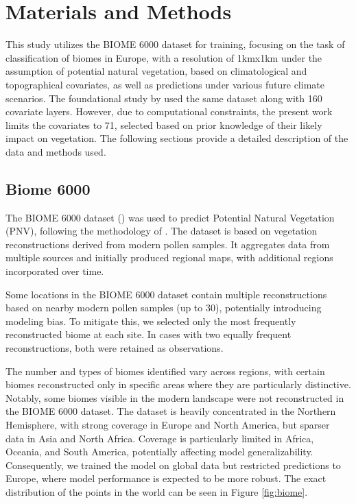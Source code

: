 \documentclass[
]{krantz}
\begin{document}
\section{Materials and Methods}\label{materials-and-methods}

This study utilizes the BIOME 6000 dataset for training, focusing on the task of classification of biomes in Europe, with a resolution of 1kmx1km under the assumption of potential natural vegetation, based on climatological and topographical covariates, as well as predictions under various future climate scenarios. The foundational study by \citet{hengl2018} used the same dataset along with 160 covariate layers. However, due to computational constraints, the present work limits the covariates to 71, selected based on prior knowledge of their likely impact on vegetation. The following sections provide a detailed description of the data and methods used.

\subsection{Biome 6000}\label{biome-6000}

The BIOME 6000 dataset (\citet{harrison2017}) was used to predict Potential Natural Vegetation (PNV), following the methodology of \citet{hengl2018}. The dataset is based on vegetation reconstructions derived from modern pollen samples. It aggregates data from multiple sources and initially produced regional maps, with additional regions incorporated over time.

Some locations in the BIOME 6000 dataset contain multiple reconstructions based on nearby modern pollen samples (up to 30), potentially introducing modeling bias. To mitigate this, we selected only the most frequently reconstructed biome at each site. In cases with two equally frequent reconstructions, both were retained as observations.

The number and types of biomes identified vary across regions, with certain biomes reconstructed only in specific areas where they are particularly distinctive. Notably, some biomes visible in the modern landscape were not reconstructed in the BIOME 6000 dataset. The dataset is heavily concentrated in the Northern Hemisphere, with strong coverage in Europe and North America, but sparser data in Asia and North Africa. Coverage is particularly limited in Africa, Oceania, and South America, potentially affecting model generalizability. Consequently, we trained the model on global data but restricted predictions to Europe, where model performance is expected to be more robust. The exact distribution of the points in the world can be seen in Figure \ref{fig:biome}.
\end{document}
